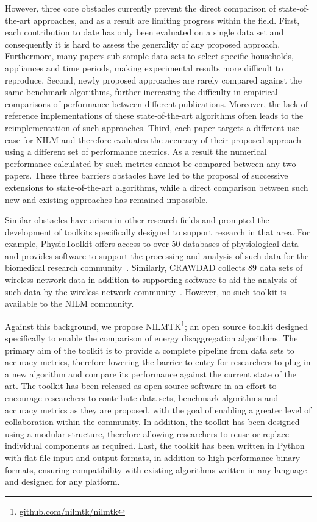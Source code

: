 \documentclass{sig-alternate}
\begin{document}
However, three core obstacles currently prevent the direct comparison of state-of-the-art approaches, and as a result are limiting progress within the field. First, each contribution to date has only been evaluated on a single data set and consequently it is hard to assess the generality of any proposed approach. Furthermore, many papers sub-sample data sets to select specific households, appliances and time periods, making experimental results more difficult to reproduce. Second, newly proposed approaches are rarely compared against the same benchmark algorithms, further increasing the difficulty in empirical comparisons of performance between different publications. Moreover, the lack of reference implementations of these state-of-the-art algorithms often leads to the reimplementation of such approaches. Third, each paper targets a different use case for NILM and therefore evaluates the accuracy of their proposed approach using a different set of performance metrics. As a result the numerical performance calculated by such metrics cannot be compared between any two papers. These three barriers obstacles have led to the proposal of successive extensions to state-of-the-art algorithms, while a direct comparison between such new and existing approaches has remained impossible.

Similar obstacles have arisen in other research fields and prompted the development of toolkits specifically designed to support research in that area. For example, PhysioToolkit offers access to over 50 databases of physiological data and provides software to support the processing and analysis of such data for the biomedical research community~\cite{physionet}. Similarly, CRAWDAD collects 89 data sets of wireless network data in addition to supporting software to aid the analysis of such data by the wireless network community~\cite{crawdad}. However, no such toolkit is available to the NILM community.

Against this background, we propose NILMTK\footnote{\url{github.com/nilmtk/nilmtk}}; an open source toolkit designed specifically to enable the comparison of energy disaggregation algorithms. The primary aim of the toolkit is to provide a complete pipeline from data sets to accuracy metrics, therefore lowering the barrier to entry for researchers to plug in a new algorithm and compare its performance against the current state of the art. The toolkit has been released as open source software in an effort to encourage researchers to contribute data sets, benchmark algorithms and accuracy metrics as they are proposed, with the goal of enabling a greater level of collaboration within the community. In addition, the toolkit has been designed using a modular structure, therefore allowing researchers to reuse or replace individual components as required. Last, the toolkit has been written in Python with flat file input and output formats, in addition to high performance binary formats, ensuring compatibility with existing algorithms written in any language and designed for any platform.
\end{document}
